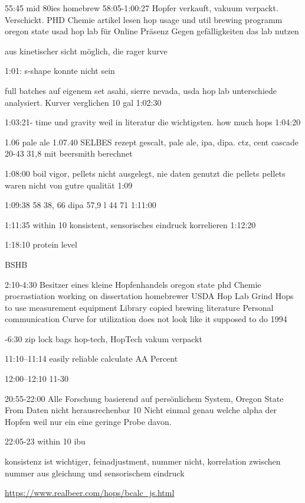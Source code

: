 \documentclass[a4paper,parskip=half]{scrartcl}
\begin{document}
55:45 mid 80ies homebrew
58:05-1:00:27
Hopfer verkauft, vakuum verpackt. Verschickt. 
PHD Chemie
artikel lesen hop usage und util
brewing programm oregon state
usad hop lab
für Online Präsenz
Gegen gefälligkeiten das lab nutzen

aus kinetischer sicht möglich, die rager kurve

1:01:
s-shape konnte nicht sein

full batches auf eigenem set
asahi, sierre nevada, usda hop lab
unterschiede analysiert.
Kurver verglichen 10 gal
1:02:30

1:03:21- time und gravity weil in literatur
die wichtigsten. how much hops 1:04:20

1.06 pale ale 1.07.40
SELBES rezept gescalt, pale ale, ipa, dipa. ctz, cent cascade
20-43 31,8 mit beersmith berechnet

1:08:00 boil vigor, pellets nicht ausgelegt, nie daten genutzt die pellets
pellets waren nicht von gutre qualität 1:09

1:09:38 58
38, 66
dipa 57,9 l 44 71
1:11:00

1:11:35 within 10 %
konsistent, sensorisches eindruck korrelieren
1:12:20

1:18:10
protein level 
\parencite{Beechum2017a}

BSHB

2:10-4:30
Besitzer eines kleine Hopfenhandels
oregon state phd Chemie
procrastiation
working on dissertation
homebrewer
USDA Hop Lab
Grind Hops to use measurement equipment
Library copied brewing literature
Personal communication
Curve for utilization does not look like it supposed to do
1994

-6:30
zip lock bags
hop-tech, HopTech vakum verpackt

11:10--11:14
easily reliable calculate AA Percent

12:00--12:10
11-30%

20:55-22:00
Alle Forschung basierend auf persönlichem System, 
Oregon State 
From Daten nicht herausrechenbar
10 %
Nicht einmal genau welche alpha der Hopfen weil nur ein eine geringe 
Probe davon.

22:05-23
within 10 ibu

konsistenz ist wichtiger, feinadjustment, nummer nicht,
korrelation zwischen nummer aus gleichung und sensorischem eindruck


\parencite{Smith2011}

\parencite{Tinseth1997}
\url{https://www.realbeer.com/hops/bcalc_js.html}
\end{document}
